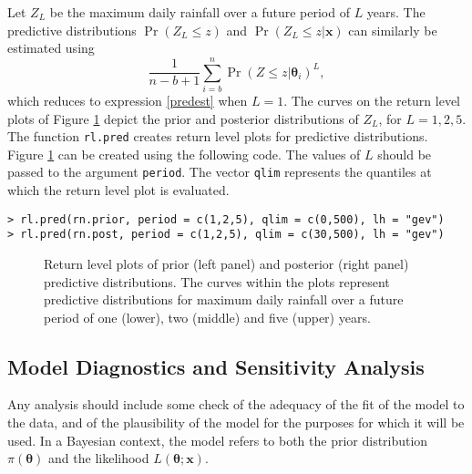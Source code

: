 \documentclass[11pt,a4paper]{article}
\newcommand{\bs}{\boldsymbol}
\begin{document}
Let $Z_L$ be the maximum daily rainfall over a future period of $L$
years.  The predictive distributions $\Pr(Z_L \leq z)$ and $\Pr(Z_L
\leq z | \bs{x})$ can similarly be estimated using
\begin{equation*}
\frac{1}{n-b+1} \sum_{i=b}^{n} \Pr(Z \leq z | \bs{\theta}_i)^L,
\end{equation*}
which reduces to expression \eqref{predest} when $L=1$.  The curves on
the return level plots of Figure \ref{predrain} depict the prior and
posterior distributions of $Z_L$, for $L=1,2,5$.  The function
\verb+rl.pred+ creates return level plots for predictive
distributions.  Figure \ref{predrain} can be created using the
following code.  The values of $L$ should be passed to the argument
\verb+period+.  The vector \verb+qlim+ represents the quantiles at
which the return level plot is evaluated.


\begin{verbatim}
> rl.pred(rn.prior, period = c(1,2,5), qlim = c(0,500), lh = "gev")
> rl.pred(rn.post, period = c(1,2,5), qlim = c(30,500), lh = "gev")
\end{verbatim}

\begin{figure}
\begin{center}
   \vspace{-1.5cm}
  \hspace{0cm} 
\end{center}
\caption{Return level plots of prior (left panel) and posterior (right
  panel) predictive distributions. The curves within the plots
  represent predictive distributions for maximum daily rainfall over a
  future period of one (lower), two (middle) and five (upper) years.}
\label{predrain}
\end{figure}

\subsection{Model Diagnostics and Sensitivity Analysis}
\label{diag}

Any analysis should include some check of the adequacy of the fit of
the model to the data, and of the plausibility of the model for the
purposes for which it will be used.  In a Bayesian context, the model
refers to both the prior distribution $\pi(\bs{\theta})$ and the
likelihood $L(\bs{\theta};\bs{x})$.
\end{document}
